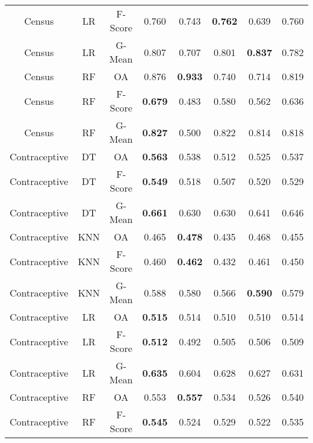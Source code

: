 \begin{longtable}{cccccccc}
         Census &         LR & F-Score &          0.760 &          0.743 & \textbf{0.762} &          0.639 &          0.760 \\
         Census &         LR &  G-Mean &          0.807 &          0.707 &          0.801 & \textbf{0.837} &          0.782 \\
         Census &         RF &      OA &          0.876 & \textbf{0.933} &          0.740 &          0.714 &          0.819 \\
         Census &         RF & F-Score & \textbf{0.679} &          0.483 &          0.580 &          0.562 &          0.636 \\
         Census &         RF &  G-Mean & \textbf{0.827} &          0.500 &          0.822 &          0.814 &          0.818 \\
  Contraceptive &         DT &      OA & \textbf{0.563} &          0.538 &          0.512 &          0.525 &          0.537 \\
  Contraceptive &         DT & F-Score & \textbf{0.549} &          0.518 &          0.507 &          0.520 &          0.529 \\
  Contraceptive &         DT &  G-Mean & \textbf{0.661} &          0.630 &          0.630 &          0.641 &          0.646 \\
  Contraceptive &        KNN &      OA &          0.465 & \textbf{0.478} &          0.435 &          0.468 &          0.455 \\
  Contraceptive &        KNN & F-Score &          0.460 & \textbf{0.462} &          0.432 &          0.461 &          0.450 \\
  Contraceptive &        KNN &  G-Mean &          0.588 &          0.580 &          0.566 & \textbf{0.590} &          0.579 \\
  Contraceptive &         LR &      OA & \textbf{0.515} &          0.514 &          0.510 &          0.510 &          0.514 \\
  Contraceptive &         LR & F-Score & \textbf{0.512} &          0.492 &          0.505 &          0.506 &          0.509 \\
  Contraceptive &         LR &  G-Mean & \textbf{0.635} &          0.604 &          0.628 &          0.627 &          0.631 \\
  Contraceptive &         RF &      OA &          0.553 & \textbf{0.557} &          0.534 &          0.526 &          0.540 \\
  Contraceptive &         RF & F-Score & \textbf{0.545} &          0.524 &          0.529 &          0.522 &          0.535 \\

\end{longtable}
